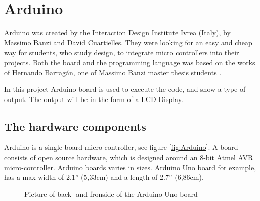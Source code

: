 \chapter{Arduino}\label{analysis:arduino}
Arduino was created by the Interaction Design Institute Ivrea (Italy), by Massimo Banzi and David Cuartielles. They were looking for an easy and cheap way for students, who study design, to integrate micro controllers into their projects\cite{arduino:hist}. Both the board and the programming language was based on the works of Hernando Barragán, one of Massimo Banzi master thesis students \cite{Wiring:thesis}.

In this project Arduino board is used to execute the code, and show a type of output. The output will be in the form of a LCD Display. 

\section{The hardware components}
Arduino is a single-board micro-controller, see figure \ref{fig:Arduino}.
A board consists of open source hardware, which is designed around an 8-bit Atmel AVR micro-controller. Arduino boards varies in sizes. Arduino Uno board for example, has a max width of 2.1'' (5,33cm) and a length of 2.7'' (6,86cm).  \\

\par
{}
\hfill
{}
\begin{figure}[H]
\caption{Picture of back- and fronside of the Arduino Uno board \cite{Arduino:board_pics}}
\label{fig:Arduino_uno}
\end{figure}
\par

